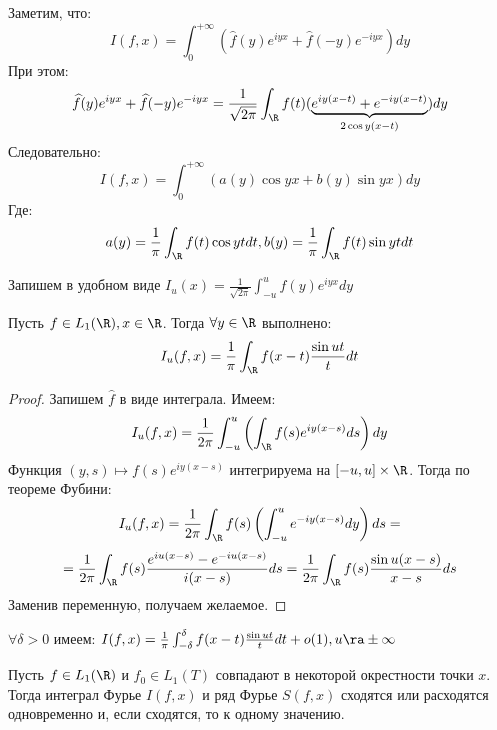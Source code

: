 Заметим, что:
\[I(f, x) = \int_0^{+\infty} \left( \widehat{f}(y)e^{iyx} + \widehat{f}(-y)e^{-iyx} \right)dy\]
При этом:
\[\widehat{f}(y)e^{iyx} + \widehat{f}(-y)e^{-iyx} = \frac{1}{\sqrt{2\pi}}\int_\R f(t) (\underbrace{e^{iy(x - t)} + e^{-iy(x - t)}}_{2\cos y(x - t)})dy\]
Следовательно:
\[I(f, x) = \int_0^{+\infty} (a(y)\cos yx + b(y)\sin yx)dy\]
Где:
\[a(y) = \frac{1}{\pi} \int_\R f(t)\cos yt dt, b(y) = \frac{1}{\pi} \int_\R f(t)\sin yt dt\]

Запишем в удобном виде \(I_u(x) = \frac{1}{\sqrt{2\pi}}\int_{-u}^u \widehat{f}(y)e^{iyx}dy\)
\begin{lemma}
    Пусть \(f \in L_1(\R), x \in \R\). Тогда \(\forall y \in \R\) выполнено:
    \[I_u(f, x) = \frac{1}{\pi}\int_\R f(x - t)\frac{\sin ut}{t}dt\]
\end{lemma}
\begin{proof}
    Запишем \(\widehat{f}\) в виде интеграла. Имеем:
    \[I_u(f, x) = \frac{1}{2\pi}\int_{-u}^u \left( \int_\R f(s)e^{iy(x - s)}ds \right)dy\]
    Функция \((y, s) \mapsto f(s)e^{iy(x - s)}\) интегрируема на \([-u, u] \times \R\). Тогда по теореме Фубини:
    \[I_u(f, x) = \frac{1}{2\pi}\int_\R f(s)\left( \int_{-u}^u e^{-iy(x - s)}dy \right)ds =\]
    \[=\frac{1}{2\pi}\int_\R f(s) \frac{e^{iu(x - s)} - e^{-iu(x - s)}}{i(x - s)}ds = \frac{1}{2\pi}\int_\R f(s) \frac{\sin u(x - s)}{x - s}ds\]
    Заменив переменную, получаем желаемое.
\end{proof}

\begin{corollary}
    \(\forall \delta > 0\) имеем: \(I(f, x) = \frac{1}{\pi}\int_{-\delta}^\delta f(x - t)\frac{\sin ut}{t}dt + o(1), u \ra \pm\infty\)
\end{corollary}

\begin{theorem}[О равносходимости]
    Пусть \(f \in L_1(\R)\) и \(f_0 \in L_1(T)\) совпадают в некоторой окрестности точки \(x\). Тогда интеграл Фурье \(I(f, x)\) и ряд Фурье \(S(f, x)\) сходятся или расходятся одновременно и, если сходятся, то к одному значению.
\end{theorem}


